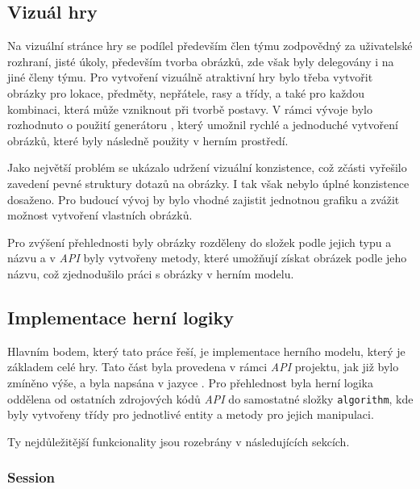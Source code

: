 \subsection{Vizuál hry}
\label{subsec:game_visuals}

Na vizuální stránce hry se podílel především člen týmu zodpovědný za uživatelské rozhraní, jisté úkoly, především tvorba obrázků, zde však byly delegovány i na jiné členy týmu. Pro vytvoření vizuálně atraktivní hry bylo třeba vytvořit obrázky pro lokace, předměty, nepřátele, rasy a třídy, a také pro každou kombinaci, která může vzniknout při tvorbě postavy. V rámci vývoje bylo rozhodnuto o použití generátoru , který umožnil rychlé a jednoduché vytvoření obrázků, které byly následně použity v herním prostředí.

Jako největší problém se ukázalo udržení vizuální konzistence, což zčásti vyřešilo zavedení pevné struktury dotazů na obrázky. I tak však nebylo úplné konzistence dosaženo. Pro budoucí vývoj by bylo vhodné zajistit jednotnou grafiku a zvážit možnost vytvoření vlastních obrázků.

Pro zvýšení přehlednosti byly obrázky rozděleny do složek podle jejich typu a názvu a v \textit{API} byly vytvořeny metody, které umožňují získat obrázek podle jeho názvu, což zjednodušilo práci s obrázky v herním modelu.

\subsection{Implementace herní logiky}
\label{subsec:game_logic}

Hlavním bodem, který tato práce řeší, je implementace herního modelu, který je základem celé hry. Tato část byla provedena v rámci \textit{API} projektu, jak již bylo zmíněno výše, a byla napsána v jazyce . Pro přehlednost byla herní logika oddělena od ostatních zdrojových kódů \textit{API} do samostatné složky \texttt{algorithm}, kde byly vytvořeny třídy pro jednotlivé entity a metody pro jejich manipulaci.


Ty nejdůležitější funkcionality jsou rozebrány v následujících sekcích.

\subsubsection*{Session}
\label{subsubsec:impl_session}

